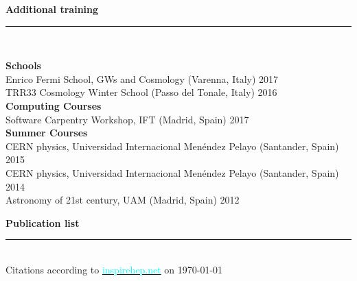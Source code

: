 \documentclass[11pt,a4paper]{article}
\newcommand{\secsizesmall}{0.05\linewidth}
\newcommand{\contsizelong}{0.95\linewidth}
\newcommand{\sectionsep}{12pt}
\begin{document}
\newpage
\textbf{Additional training} \vspace{-8pt}\\ {\rule{\linewidth}{0.6pt}}\vspace{5pt}\\
\begin{minipage}[t]{\secsizesmall}
\begin{flushleft}
\end{flushleft}
\end{minipage}
\begin{minipage}[t]{\contsizelong}
\begin{flushleft}
\textbf{Schools} \\
Enrico Fermi School, GWs and Cosmology (Varenna, Italy) \hfill  2017 \\
TRR33 Cosmology Winter School (Passo del Tonale, Italy) \hfill 2016 \\
\vspace{5pt}
\textbf{Computing Courses} \\
Software Carpentry Workshop, IFT (Madrid, Spain) \hfill 2017 \\
\vspace{5pt}
\textbf{Summer Courses} \\
CERN physics, Universidad Internacional Menéndez Pelayo (Santander, Spain) \hfill 2015 \\
CERN physics, Universidad Internacional Menéndez Pelayo (Santander, Spain) \hfill 2014 \\
Astronomy of 21st century, UAM (Madrid, Spain) \hfill  2012 
\end{flushleft}
\end{minipage}

\vspace{\sectionsep}
\textbf{Publication list} \vspace{-8pt}\\ {\rule{\linewidth}{0.6pt}}\vspace{5pt}\\
Citations according to  \href{https://inspirehep.net/literature?sort=mostrecent&size=25&page=1&q=J.M.Ezquiaga&ui-citation-summary=true}{\textcolor{cyan}{inspirehep.net}} on \today \vspace{5pt}\\%
\vspace{-20pt}

\end{document}
